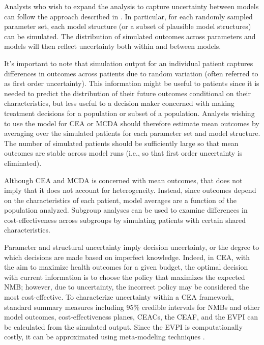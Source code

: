 \documentclass[11pt,final,fleqn]{article}
\theoremstyle{plain}
\begin{document}
Analysts who wish to expand the analysis to capture uncertainty between models can follow the approach described in \citet{bojke2009characterizing}. In particular, for each randomly sampled parameter set, each model structure (or a subset of plausible model structures) can be simulated. The distribution of simulated outcomes across parameters and models will then reflect uncertainty both within and between models. 

It's important to note that simulation output for an individual patient captures differences in outcomes across patients due to random variation (often referred to as first order uncertainty). This information might be useful to patients since it is needed to predict the distribution of their future outcomes conditional on their characteristics, but less useful to a decision maker concerned with making treatment decisions for a population or subset of a population. Analysts wishing to use the model for CEA or MCDA should therefore estimate mean outcomes by averaging over the simulated patients for each parameter set and model structure. The number of simulated patients should be sufficiently large so that mean outcomes are stable across model runs (i.e., so that first order uncertainty is eliminated). 

Although CEA and MCDA is concerned with mean outcomes, that does not imply that it does not account for heterogeneity. Instead, since outcomes depend on the characteristics of each patient, model averages are a function of the population analyzed. Subgroup analyses can be used to examine differences in cost-effectiveness across subgroups by simulating patients with certain shared characteristics. 

Parameter and structural uncertainty imply decision uncertainty, or the degree to which decisions are made based on imperfect knowledge. Indeed, in CEA, with the aim to maximize health outcomes for a given budget, the optimal decision with current information is to choose the policy that maximizes the expected NMB; however, due to uncertainty, the incorrect policy may be considered the most cost-effective. To characterize uncertainty within a CEA framework, standard summary measures including 95\% credible intervals for NMBs and other model outcomes, cost-effectiveness planes, CEACs, the CEAF, and the EVPI can be calculated from the simulated output. Since the EVPI is computationally costly, it can be approximated using meta-modeling techniques \citep{jalal2013linear, jalal2015computing, heath2016estimating}.
\end{document}
